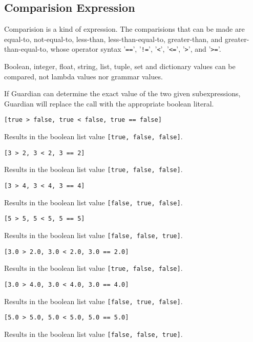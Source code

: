 
\subsection{Comparision Expression}
{
	Comparision is a kind of expression. The comparisions that can be made
	are equal-to, not-equal-to,
	less-than, less-than-equal-to,
	greater-than, and greater-than-equal-to,
	whose operator syntax
	'\texttt{==}', '\texttt{!=}',
	'\texttt{<}', '\texttt{<=}',
	'\texttt{>}', and '\texttt{>=}'.
	
	Boolean, integer, float, string, list, tuple, set and dictionary values
	can be compared, not lambda values nor grammar values.
	
	If Guardian can determine the exact value of the two given subexpressions,
	Guardian will replace the call with the appropriate boolean literal.
	
	\begin{itemize}
	{
		\item \texttt{[true > false, true < false, true == false]}
		
			Results in the boolean list value \texttt{[true, false, false]}.
			
		\item \texttt{[3 > 2, 3 < 2, 3 == 2]}
		
			Results in the boolean list value \texttt{[true, false, false]}.
			
		\item \texttt{[3 > 4, 3 < 4, 3 == 4]}
		
			Results in the boolean list value \texttt{[false, true, false]}.
			
		\item \texttt{[5 > 5, 5 < 5, 5 == 5]}
		
			Results in the boolean list value \texttt{[false, false, true]}.
			
		\item \texttt{[3.0 > 2.0, 3.0 < 2.0, 3.0 == 2.0]}
		
			Results in the boolean list value \texttt{[true, false, false]}.
			
		\item \texttt{[3.0 > 4.0, 3.0 < 4.0, 3.0 == 4.0]}
		
			Results in the boolean list value \texttt{[false, true, false]}.
			
		\item \texttt{[5.0 > 5.0, 5.0 < 5.0, 5.0 == 5.0]}
		
			Results in the boolean list value \texttt{[false, false, true]}.
			
}
\end{itemize}}
